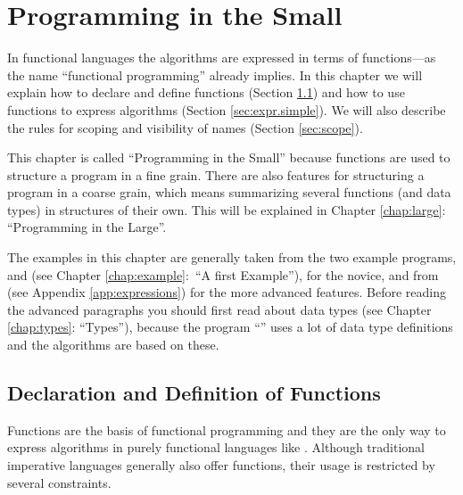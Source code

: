 \chapter{Programming in the Small}
\label{chap:small}
\novice
In functional languages the algorithms are expressed in terms of
functions---as the name ``functional programming'' already implies.
In this chapter we will explain how to declare and define functions
(Section \ref{sec:fun}) and how to use functions to express algorithms
(Section \ref{sec:expr.simple}).
We will also describe the rules for scoping and visibility of
names (Section \ref{sec:scope}).

\medskip
This chapter is called ``Programming in the Small'' because functions
are used to structure a program in a fine grain.
There are also features for  structuring a program in a coarse grain, which
means summarizing several functions (and data types) in structures
of their own. 
This will be explained in Chapter \ref{chap:large}: ``Programming in
the Large''.
\medskip

The examples in this chapter are generally taken from the two example 
programs,
 and  (see Chapter
\ref{chap:example}:~``A first Example''), for the novice, and from
 (see Appendix \ref{app:expressions}) for the more
advanced features.
Before reading the advanced paragraphs you should first read about data
types  (see Chapter \ref{chap:types}: ``Types''), because the program
``'' uses a lot of data type definitions and the
algorithms are based on these.


\section{Declaration and Definition of Functions}
\label{sec:fun}
\novice
Functions are the basis of functional programming and they are the
only way to express algorithms in purely functional languages
like \opal.
Although traditional imperative languages  generally also  offer
functions, their usage is  restricted by several constraints.

